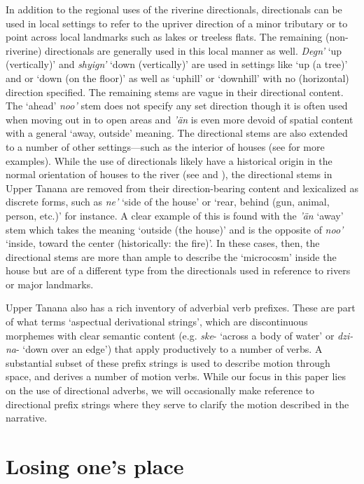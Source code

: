 In addition to the regional uses of the riverine directionals, directionals can be used in local settings to refer to the upriver direction of a minor tributary or to point across local landmarks such as lakes or treeless flats. The remaining (non-riverine) directionals are generally used in this local manner as well. {\em Degn'} `up (vertically)' and {\em shyign'} `down (vertically)' are used in settings like `up (a tree)' and or `down (on the floor)' as well as `uphill' or `downhill' with no (horizontal) direction specified. The remaining stems are vague in their directional content. The `ahead' {\em noo'} stem does not specify any set direction though it is often used when moving out in to open areas and {\em 'än} is even more devoid of spatial content with a general `away, outside' meaning. The directional stems are also extended to a number of other settings—such as the interior of houses (see \citealp[131]{KariJ2010} for more examples). While the use of directionals likely have a historical origin in the normal orientation of houses to the river (see \citealp{FortescueM2011} and \citealp[602]{LeerJ1989}), the directional stems in Upper Tanana are removed from their direction-bearing content and lexicalized as discrete forms, such as {\em ne'} `side of the house' or `rear, behind (gun, animal, person, etc.)' for instance. A clear example of this is found with the {\em 'än} `away' stem which takes the meaning `outside (the house)' and is the opposite of {\em noo'} `inside, toward the center (historically: the fire)'. In these cases, then, the directional stems are more than ample to describe the `microcosm' \citep[7]{FortescueM2011} inside the house but are of a different type from the directionals used in reference to rivers or major landmarks.

Upper Tanana also has a rich inventory of adverbial verb prefixes. These are part of what \citet[28]{KariJ1979} terms `aspectual derivational strings', which are discontinuous morphemes with clear semantic content (e.g. {\em ske}- `across a body of water' or {\em dzi-na}- `down over an edge') that apply productively to a number of verbs. A substantial subset of these prefix strings is used to describe motion through space, and derives a number of motion verbs. While our focus in this paper lies on the use of directional adverbs, we will occasionally make reference to directional prefix strings where they serve to clarify the motion described in the narrative.

\section{Losing one's place}
\label{section:losing-direction}


